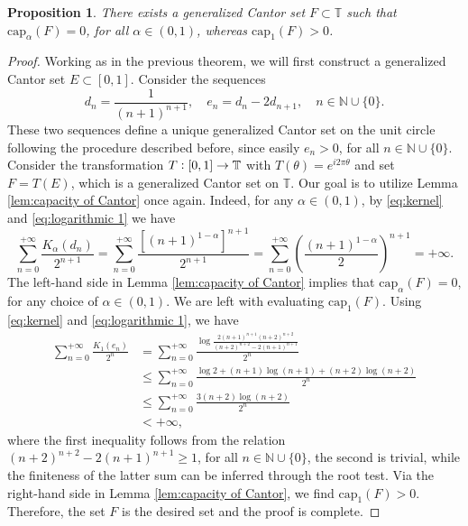 \documentclass[12pt]{amsart}
\newtheorem{proposition}[theorem]{Proposition}
\theoremstyle{definition}\newtheorem{remark}[theorem]{Remark}
\theoremstyle{definition}\newtheorem{example}[theorem]{Example}
\theoremstyle{definition}\newtheorem{definition}{Definition}
\numberwithin{equation}{section}
\newcommand\TT{{\mathbb T}}
\begin{document}
\begin{proposition}\label{construction cantor a 1}
There exists a generalized Cantor set $F\subset \TT$ such that $\mathrm{cap}_\alpha(F)=0$, for all $\alpha\in (0,1)$, whereas $\mathrm{cap}_1(F)>0$.
\end{proposition}
\begin{proof}
Working as in the previous theorem, we will first construct a generalized Cantor set $E\subset [0,1]$. Consider the sequences
\begin{equation}\label{eq:logarithmic 1}
    d_n=\frac{1}{(n+1)^{n+1}}, \quad e_n=d_n-2d_{n+1}, \quad n\in\mathbb{N}\cup\{0\}.
\end{equation}
These two sequences define a unique generalized Cantor set on the unit circle following the procedure described before, since easily $e_n>0$, for all $n\in\mathbb{N}\cup\{0\}$. Consider the transformation $T\vcentcolon[0,1]\to\TT$ with $T(\theta)=e^{i2\pi\theta}$ and set $F=T(E)$, which is a generalized Cantor set on $\TT$. Our goal is to utilize Lemma \ref{lem:capacity of Cantor} once again. Indeed, for any $\alpha\in(0,1)$, by \eqref{eq:kernel} and \eqref{eq:logarithmic 1} we have
\begin{equation*}
    \sum_{n=0}^{+\infty}\frac{K_\alpha(d_n)}{2^{n+1}}=\sum_{n=0}^{+\infty}\frac{[(n+1)^{1-\alpha}]^{n+1}}{2^{n+1}}=\sum_{n=0}^{+\infty}\left(\frac{(n+1)^{1-\alpha}}{2}\right)^{n+1}=+\infty.
\end{equation*}
The left-hand side in Lemma \ref{lem:capacity of Cantor} implies that $\mathrm{cap}_\alpha(F)=0$, for any choice of $\alpha\in(0,1)$. We are left with evaluating $\mathrm{cap}_1(F)$. Using \eqref{eq:kernel} and \eqref{eq:logarithmic 1}, we have
\begin{align*}
    \sum_{n=0}^{+\infty}\frac{K_1(e_n)}{2^n}&=\sum_{n=0}^{+\infty}\frac{\log\frac{2(n+1)^{n+1}(n+2)^{n+2}}{(n+2)^{n+2}-2(n+1)^{n+1}}}{2^n} \\
    &\le \sum_{n=0}^{+\infty}\frac{\log2+(n+1)\log(n+1)+(n+2)\log(n+2)}{2^n}\\
    &\le \sum_{n=0}^{+\infty}\frac{3(n+2)\log(n+2)}{2^n}\\
    &<+\infty,
\end{align*}
where the first inequality follows from the relation $(n+2)^{n+2}-2(n+1)^{n+1}\ge 1$, for all $n\in\mathbb{N}\cup\{0\}$, the second is trivial, while the finiteness of the latter sum can be inferred through the root test. Via the right-hand side in Lemma \ref{lem:capacity of Cantor}, we find $\mathrm{cap}_1(F)>0$. Therefore, the set $F$ is the desired set and the proof is complete.
\end{proof}
\end{document}
